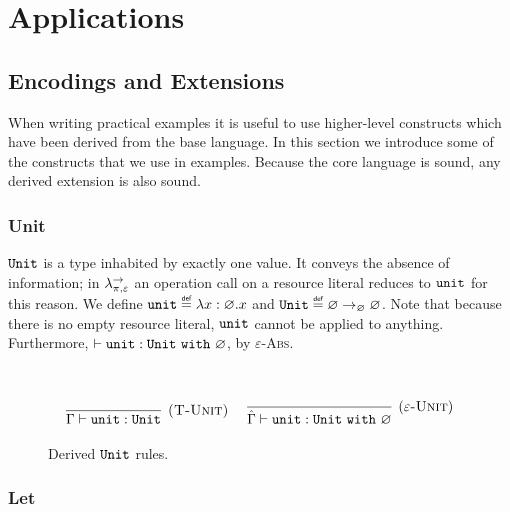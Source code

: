 
\chapter{Applications}

\section{Encodings and Extensions}

When writing practical examples it is useful to use higher-level constructs which have been derived from the base language. In this section we introduce some of the constructs that we use in examples. Because the core language is sound, any derived extension is also sound.

\subsection{Unit}

$\mathtt{Unit}$ is a type inhabited by exactly one value. It conveys the absence of information; in $\lambda^{\rightarrow}_{\pi, \varepsilon}$ an operation call on a resource literal reduces to $\mathtt{unit}$ for this reason. We define $\kwa{unit} \defn \lambda x: \varnothing. x$ and $\kwa{Unit} \defn \varnothing \rightarrow_{\varnothing} \varnothing$. Note that because there is no empty resource literal, $\mathtt{unit}$ cannot be applied to anything. Furthermore, $\vdash \mathtt{unit} : \mathtt{Unit}~\mathtt{with}~ \varnothing$, by \textsc{$\varepsilon$-Abs}.



\begin{figure}[h]


 \\


\[
\begin{array}{c}

\infer[\textsc{(T-Unit)}]
	{\Gamma \vdash \unit : \Unit}
	{} ~~~~

\infer[(\textsc{$\varepsilon$-Unit})]
	{\hat \Gamma \vdash \unit : \Unit~\kw{with} \varnothing}
	{}

\end{array}
\]

	
\caption{Derived $\mathtt{Unit}$ rules.}
\label{This is the label.}
\end{figure}

\subsection{Let}

